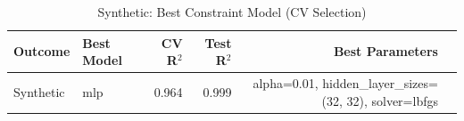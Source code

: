 \begin{table}[ht]
\centering
\caption{Synthetic: Best Constraint Model (CV Selection)}
\begin{tabular}{llrrrl}
\toprule
Outcome & Best Model & CV R$^2$ & Test R$^2$ & Best Parameters \\
\midrule
Synthetic & mlp & 0.964 & 0.999 & alpha=0.01, hidden_layer_sizes=(32, 32), solver=lbfgs \\
\bottomrule
\end{tabular}
\end{table}